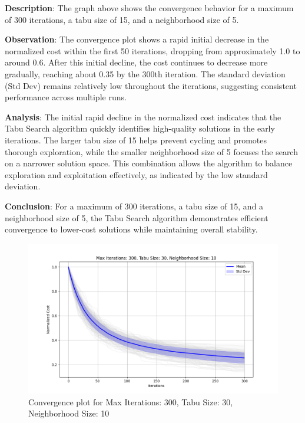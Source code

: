 \documentclass[
]{article}
\begin{document}
    \textbf{Description}: The graph above shows the convergence behavior for a maximum of 300 iterations, a tabu size of 15, and a neighborhood size of 5.

    \textbf{Observation}: The convergence plot shows a rapid initial decrease in the normalized cost within the first 50 iterations, dropping from approximately 1.0 to around 0.6. After this initial decline, the cost continues to decrease more gradually, reaching about 0.35 by the 300th iteration. The standard deviation (Std Dev) remains relatively low throughout the iterations, suggesting consistent performance across multiple runs.

    \textbf{Analysis}: The initial rapid decline in the normalized cost indicates that the Tabu Search algorithm quickly identifies high-quality solutions in the early iterations. The larger tabu size of 15 helps prevent cycling and promotes thorough exploration, while the smaller neighborhood size of 5 focuses the search on a narrower solution space. This combination allows the algorithm to balance exploration and exploitation effectively, as indicated by the low standard deviation.

    \textbf{Conclusion}: For a maximum of 300 iterations, a tabu size of 15, and a neighborhood size of 5, the Tabu Search algorithm demonstrates efficient convergence to lower-cost solutions while maintaining overall stability.

    \begin{figure}[H]
        \centering
        \includegraphics[width=\textwidth]{tabu_search/max_iter_300_tabu_size_30_neighborhood_size_10}
        \caption{Convergence plot for Max Iterations: 300, Tabu Size: 30, Neighborhood Size: 10}
        \label{fig:ts_300_30_10}
    \end{figure}
\end{document}
